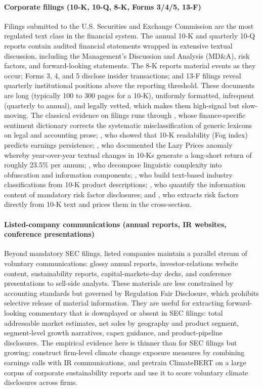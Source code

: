 \paragraph{Corporate filings (10-K, 10-Q, 8-K, Forms 3/4/5, 13-F)}

Filings submitted to the U.S. Securities and Exchange Commission are the most regulated text class in the financial system. The annual 10-K and quarterly 10-Q reports contain audited financial statements wrapped in extensive textual discussion, including the Management's Discussion and Analysis (MD\&A), risk factors, and forward-looking statements. The 8-K reports material events as they occur; Forms 3, 4, and 5 disclose insider transactions; and 13-F filings reveal quarterly institutional positions above the reporting threshold. These documents are long (typically 100 to 300 pages for a 10-K), uniformly formatted, infrequent (quarterly to annual), and legally vetted, which makes them high-signal but slow-moving. The classical evidence on filings runs through \cite{loughran2011liability}, whose finance-specific sentiment dictionary corrects the systematic misclassification of generic lexicons on legal and accounting prose; \cite{li2008annual}, who showed that 10-K readability (Fog index) predicts earnings persistence; \cite{cohen2020lazy}, who documented the Lazy Prices anomaly whereby year-over-year textual changes in 10-Ks generate a long-short return of roughly 23.5\% per annum; \cite{bushee2018linguistic}, who decompose linguistic complexity into obfuscation and information components; \cite{hoberg2016text}, who build text-based industry classifications from 10-K product descriptions; \cite{campbell2014information}, who quantify the information content of mandatory risk factor disclosures; and \cite{lopezlira2023risk}, who extracts risk factors directly from 10-K text and prices them in the cross-section.

\paragraph{Listed-company communications (annual reports, IR websites, conference presentations)}

Beyond mandatory SEC filings, listed companies maintain a parallel stream of voluntary communications: glossy annual reports, investor-relations website content, sustainability reports, capital-markets-day decks, and conference presentations to sell-side analysts. These materials are less constrained by accounting standards but governed by Regulation Fair Disclosure, which prohibits selective release of material information. They are useful for extracting forward-looking commentary that is downplayed or absent in SEC filings: total addressable market estimates, net sales by geography and product segment, segment-level growth narratives, capex guidance, and product-pipeline disclosures. The empirical evidence here is thinner than for SEC filings but growing: \cite{sautner2023firm} construct firm-level climate change exposure measures by combining earnings calls with IR communications, and \cite{webersinke2022climatebert} pretrain ClimateBERT on a large corpus of corporate sustainability reports and use it to score voluntary climate disclosures across firms.

